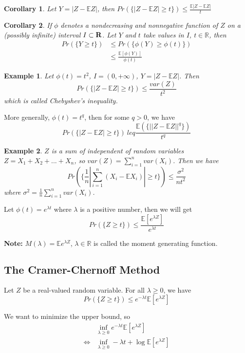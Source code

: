 \documentclass[11pt]{article}
\def\R{{\bf R}}
\def\BR{{\mathbb R}}
\def\BE{{\mathbb E}}
\newtheorem{corollary}{Corollary}[section]
\newtheorem{example}{Example}[section]
\begin{document}
\begin{corollary}
Let $Y = |Z - \BE Z|$, then $Pr(\{|Z - \BE Z| \geq t\}) \leq \frac{\BE |Z - \BE Z|}{t}$
\end{corollary}

\begin{corollary}
If $\phi$ denotes a nondecreasing and nonnegative function of $Z$ on a (possibly infinite) interval $I \subset \R$. Let $Y$ and $t$ take values in $I$, $t\in \BR$, then
\[\begin{split} Pr(\{Y \geq t\}) &\leq Pr(\{\phi(Y) \geq \phi(t) \})\\
&\leq \frac{\BE[\phi(Y)]}{\phi(t)} \end{split}\]
\end{corollary}

\begin{example}
Let $\phi(t) = t^2$, $I = (0, +\infty)$, $Y = |Z - \BE Z|$. Then
\[ Pr(\{ |Z - \BE Z| \geq t \}) \leq \frac{var(Z)}{t^2} \]
which is called Chebyshev's inequality.
\end{example}

More generally, $\phi(t) = t^q$, then for some $q > 0$, we have 
\[
Pr (\{ |Z - \BE Z| \geq t \}) \ leq \frac{\BE (\{ ||Z - \BE Z||^q \})}{t^q}
\]

\begin{example}
$Z$ is a sum of independent of random variables $Z = X_1 + X_2 + ... + X_n$, so
$var(Z) = \sum_{i=1}^n var(X_i)$.
Then we have 
\[
Pr (\{ \frac{1}{n} |\sum_{i=1}^n (X_i - \BE X_i)| \geq t \}) \leq \frac{\sigma^2}{nt^2}
\]
where $\sigma^2 = \frac{1}{n} \sum_{i=1}^n var(X_i)$.
\end{example}

Let $\phi(t) = e^{\lambda t}$ where $\lambda$ is a positive number, then we will get 
\[ Pr(\{Z \geq t\}) \leq \frac{\BE[e^{\lambda Z}]}{e^{\lambda t}}
\]

\textbf{Note:} $M(\lambda) = \BE e^{\lambda Z}$, $\lambda \in \BR$ is called the moment generating function.

\subsection{The Cramer-Chernoff Method}
Let $Z$ be a real-valued random variable. For all $\lambda \geq 0$, we have
\[Pr(\{ Z \geq t \}) \leq e^{-\lambda t} \BE [e^{\lambda Z}] \]

We want to minimize the upper bound, so 
\[\begin{split}
& \inf_{\lambda \geq 0} e^{-\lambda t} \BE[e^{\lambda Z}] \\
\Leftrightarrow & \inf_{\lambda \geq 0} -\lambda t +  \log \BE[e^{\lambda Z}]
\end{split}\]
\end{document}
